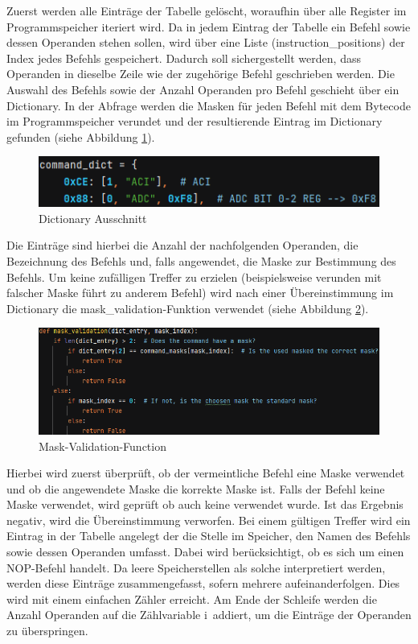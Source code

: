 \documentclass[12pt]{article}
\newcommand{\imgSpaceBefore}{\vspace{10pt}}
\begin{document}
\noindent
Zuerst werden alle Einträge der Tabelle gelöscht, woraufhin über alle Register im Programmspeicher iteriert wird. Da in jedem Eintrag der Tabelle ein Befehl sowie dessen Operanden stehen sollen, wird über eine Liste (instruction\_positions) der Index jedes Befehls gespeichert. Dadurch soll sichergestellt werden, dass Operanden in dieselbe Zeile wie der zugehörige Befehl geschrieben werden. Die Auswahl des Befehls sowie der Anzahl Operanden pro Befehl geschieht über ein Dictionary. In der Abfrage werden die Masken für jeden Befehl mit dem Bytecode im Programmspeicher verundet und der resultierende Eintrag im Dictionary gefunden (siehe Abbildung \ref{fig:Dict}).\imgSpaceBefore

\begin{figure}[H]
\centering
\includegraphics[width=12cm]{bilder/CmdDictExample}
\caption{Dictionary Ausschnitt}
\label{fig:Dict}
\end{figure}

\noindent
Die Einträge sind hierbei die Anzahl der nachfolgenden Operanden, die Bezeichnung des Befehls und, falls angewendet, die Maske zur Bestimmung des Befehls. Um keine zufälligen Treffer zu erzielen (beispielsweise verunden mit falscher Maske führt zu anderem Befehl) wird nach einer Übereinstimmung im Dictionary die \glqq mask\_validation\grqq-Funktion verwendet (siehe Abbildung \ref{fig:MaskValid}).\imgSpaceBefore

\begin{figure}[H]
\centering
\includegraphics[width=14cm]{bilder/mask_valid}
\caption{Mask-Validation-Function}
\label{fig:MaskValid}
\end{figure}

\noindent
Hierbei wird zuerst überprüft, ob der vermeintliche Befehl eine Maske verwendet und ob die angewendete Maske die korrekte Maske ist. Falls der Befehl keine Maske verwendet, wird geprüft ob auch keine verwendet wurde. Ist das Ergebnis negativ, wird die Übereinstimmung verworfen. Bei einem gültigen Treffer wird ein Eintrag in der Tabelle angelegt der die Stelle im Speicher, den Namen des Befehls sowie dessen Operanden umfasst. Dabei wird berücksichtigt, ob es sich um einen NOP-Befehl handelt. Da leere Speicherstellen als solche interpretiert werden, werden diese Einträge zusammengefasst, sofern mehrere aufeinanderfolgen. Dies wird mit einem einfachen Zähler erreicht. Am Ende der Schleife werden die Anzahl Operanden auf die Zählvariable \glqq i\grqq\ addiert, um die Einträge der Operanden zu überspringen.
\end{document}
